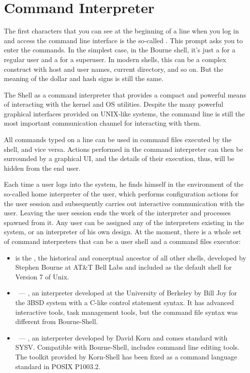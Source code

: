 \section*{Command Interpreter}

The first characters that you can see at the beginning of a line when you log
in and access the command line interface is the so-called .
This prompt asks you to enter the commands. In the simplest case,
in the Bourne shell, it's just a  for a regular user and
a  for a superuser. In modern shells, this can be a complex
construct with host and user names, current directory, and so on.
But the meaning of the dollar and hash signs is still the same.

The Shell as a command interpreter that provides a compact and powerful
means of interacting with the kernel and OS utilities. Despite the many
powerful graphical interfaces provided on UNIX-like systems, the command
line is still the most important communication channel for interacting
with them.

All commands typed on a line can be used in command files executed by
the shell, and vice versa. Actions performed in the command interpreter can
then be surrounded by a graphical UI, and the details of their execution,
thus, will be hidden from the end user.

Each time a user logs into the system, he finds himself in the environment of
the so-called home interpreter of the user, which performs configuration
actions for the user session and subsequently carries out interactive
communication with the user. Leaving the user session ends the work of
the interpreter and processes spawned from it. Any user can be assigned any of
the interpreters existing in the system, or an interpreter of his own design.
At the moment, there is a whole set of command interpreters that can be a user
shell and a command files executor:
\begin{itemize}
\item {} is the , the historical and conceptual
      ancestor of all other shells, developed by Stephen Bourne at AT\&T Bell
      Labs and included as the default shell for Version 7 of Unix.
\item {}~--- , an interpreter developed at the University
      of Berkeley by Bill Joy for the 3BSD system with a C-like control
      statement syntax. It has advanced interactive tools, task management tools,
      but the command file syntax was different from Bourne-Shell.
\item {}~--- , an interpreter developed by David Korn
      and comes standard with SYSV. Compatible with Bourne-Shell, includes
      command line editing tools. The toolkit provided by Korn-Shell has been
      fixed as a command language standard in POSIX P1003.2.
\end{itemize}

